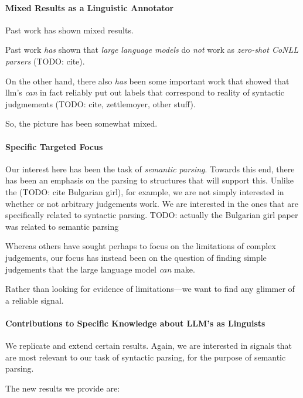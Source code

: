 \label{sec:discussion}

\paragraph{Mixed Results as a Linguistic Annotator}
Past work has shown mixed results.

Past work {\em has} shown that {\em large language models} do {\em not} work as {\em zero-shot CoNLL parsers} (TODO: cite).

On the other hand, there also {\em has} been some important work that showed that llm's {\em can} in fact reliably put out labels that correspond to reality of syntactic judgmements (TODO: cite, zettlemoyer, other stuff).

So, the picture has been somewhat mixed.


\paragraph{Specific Targeted Focus}

Our interest here has been the task of {\em semantic parsing}.
Towards this end, there has been an emphasis on the parsing to structures that will support this.
Unlike the (TODO: cite Bulgarian girl), for example, we are not simply interested in whether or not arbitrary judgements work.
We are interested in the ones that are specifically related to syntactic parsing.
TODO: actually the Bulgarian girl paper was related to semantic parsing

Whereas others have sought perhaps to focus on the limitations of complex judgements, our focus has instead been on the question of finding simple judgements that the large language model {\em can} make.

Rather than looking for evidence of limitations---we want to find any glimmer of a reliable signal.

\paragraph{Contributions to Specific Knowledge about LLM's as Linguists}

We replicate and extend certain results.
Again, we are interested in signals that are most relevant to our task of syntactic parsing, for the purpose of semantic parsing.

The new results we provide are:


